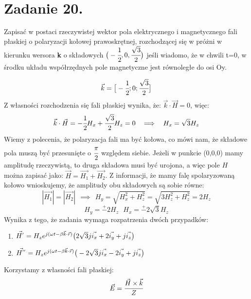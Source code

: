 \section*{Zadanie 20.}
\begin{task}
Zapisać w postaci rzeczywistej wektor pola elektrycznego i magnetycznego fali płaskiej o polaryzacji kołowej prawoskrętnej, rozchodzącej się w próżni w kierunku wersora \textbf{k} o składowych $\big{(}-\cfrac{1}{2},0,\cfrac{\sqrt{3}}{2}  \big{)}$ jeśli wiadomo, że w chwili t=0, w środku układu współrzędnych pole magnetyczne jest równoległe do osi Oy.\\
\end{task}

\begin{solution}


$$\vec{k}=\big{[}-\cfrac{1}{2};0;\cfrac{\sqrt{3}}{2}\big{]} $$
Z własności rozchodzenia się fali płaskiej wynika, że: $\vec{k}\cdot\vec{H}=0$, więc:
$$\vec{k}\cdot\vec{H}=-\cfrac{1}{2}H_{x}+\cfrac{\sqrt{3}}{2}H_{z}=0 \ \ \implies \ \ H_{x}=\sqrt{3}H_{z}$$
Wiemy z polecenia, że polaryzacja fali ma być kołowa, co mówi nam, że składowe pola muszą być przesunięte o $\cfrac{\pi}{2}$ względem siebie. Jeżeli w punkcie (0,0,0) mamy amplitudę rzeczywistą, to druga składowa musi być urojona, a więc pole $H$ można zapisać jako: $\vec{H}=\vec{H_{1}}+\vec{H_{2}}$. Z informacji, że mamy falę spolaryzowaną kołowo wnioskujemy, że amplitudy obu składowych są sobie równe:
$$|\vec{H_{1}}|=|\vec{H_{2}}| \ \ \implies \ \ H_{y}=\sqrt{H_{x}^{2}+H_{z}^{2}}=\sqrt{3H_{z}^{2}+H_{z}^{2}}=2H_{z}$$
$$H_{y}=\stackrel{+}{-}2H_{z}\ \ \ H_{x}=\stackrel{+}{-}2\sqrt{3}H_{z}$$
Wynika z tego, że zadania wymaga rozpatrzenia dwóch przypadków:\\
\begin{enumerate}[1*]
\item $\vec{H^{'}} = H_{z} e^{j(\omega t - \beta \vec{k} \cdot\vec{r})}\big{(} 2\sqrt{3}j\vec{i_{x}} + 2\vec{i_{y}} +j\vec{i_{z}} \big{)}$
\item $\vec{H^{''}} = H_{z} e^{j(\omega t - \beta \vec{k} \cdot\vec{r})}\big{(} -2\sqrt{3}j\vec{i_{x}} - 2\vec{i_{y}} +j\vec{i_{z}} \big{)}$
\end{enumerate}
Korzystamy z własności fali płaskiej:
$$ \vec{E} = \cfrac{\vec{H}\times\vec{k}}{Z} $$\\


\end{solution}
